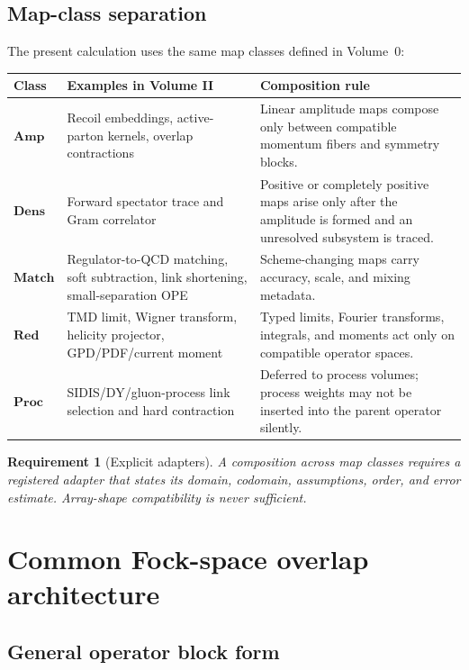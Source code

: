 \documentclass[11pt]{article}
\newtheorem{requirement}[definition]{Requirement}
\newcommand{\Amp}{\mathbf{Amp}}
\newcommand{\Dens}{\mathbf{Dens}}
\newcommand{\Match}{\mathbf{Match}}
\newcommand{\Red}{\mathbf{Red}}
\newcommand{\Proc}{\mathbf{Proc}}
\begin{document}
\subsection{Map-class separation}

The present calculation uses the same map classes defined in Volume~0:
\begin{longtable}{L{0.15\textwidth}L{0.31\textwidth}L{0.44\textwidth}}
\toprule
Class & Examples in Volume II & Composition rule\\
\midrule
\endhead
\(\Amp\) & Recoil embeddings, active-parton kernels, overlap contractions & Linear amplitude maps compose only between compatible momentum fibers and symmetry blocks.\\
\(\Dens\) & Forward spectator trace and Gram correlator & Positive or completely positive maps arise only after the amplitude is formed and an unresolved subsystem is traced.\\
\(\Match\) & Regulator-to-QCD matching, soft subtraction, link shortening, small-separation OPE & Scheme-changing maps carry accuracy, scale, and mixing metadata.\\
\(\Red\) & TMD limit, Wigner transform, helicity projector, GPD/PDF/current moment & Typed limits, Fourier transforms, integrals, and moments act only on compatible operator spaces.\\
\(\Proc\) & SIDIS/DY/gluon-process link selection and hard contraction & Deferred to process volumes; process weights may not be inserted into the parent operator silently.\\
\bottomrule
\end{longtable}

\begin{requirement}[Explicit adapters]
\label{req:explicit-adapters}
A composition across map classes requires a registered adapter that states
its domain, codomain, assumptions, order, and error estimate.  Array-shape
compatibility is never sufficient.
\end{requirement}

\section{Common Fock-space overlap architecture}
\label{sec:common-overlap}

\subsection{General operator block form}
\end{document}
